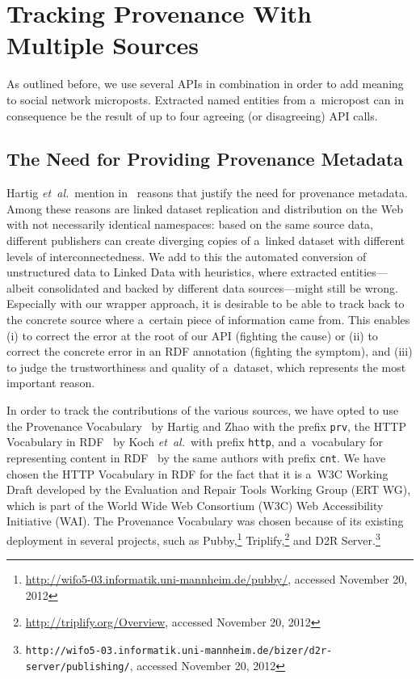 \section{Tracking Provenance With Multiple Sources}                    \label{sec:tracking}

As outlined before, we use several APIs in combination
in order to add meaning to social network microposts.
Extracted named entities from a~micropost can in consequence
be the result of up to four agreeing (or disagreeing) API calls.

\subsection{The Need for Providing Provenance Metadata}

Hartig \emph{et~al.}\ mention in~\cite{hartig2010provenance}
reasons that justify the need for provenance metadata.
Among these reasons are linked dataset replication and distribution
on the Web with not necessarily identical namespaces:
based on the same source data, different publishers can
create diverging copies of a~linked dataset
with different levels of interconnectedness.
We add to this the automated conversion of unstructured data
to Linked Data with heuristics,
where extracted entities---albeit consolidated
and backed by different data sources---might still be wrong.
Especially with our wrapper approach,
it is desirable to be able to track back to the concrete source
where a~certain piece of information came from.
This enables
(i) to correct the error at the root of our API
(fighting the cause) or
(ii) to correct the concrete error in an RDF annotation
(fighting the symptom), and
(iii) to judge the trustworthiness and quality of a~dataset,
which represents the most important reason.

In order to track the contributions of the various sources,
we have opted to use the Provenance
Vocabulary~\cite{hartig2012provenance}
by Hartig and Zhao with the prefix \texttt{prv},
the HTTP Vocabulary in RDF~\cite{koch2011http}
by Koch \emph{et~al.}\ with prefix \texttt{http},
and a~vocabulary for representing content in
RDF~\cite{koch2011content}
by the same authors with prefix \texttt{cnt}.
We have chosen the HTTP Vocabulary in RDF for the fact that
it is a~W3C Working Draft developed by the
Evaluation and Repair Tools Working Group (ERT WG),
which is part of the World Wide Web Consortium (W3C)
Web Accessibility Initiative (WAI).
The Provenance Vocabulary was chosen because of its existing
deployment in several projects, such as
Pubby,\footnote{\url{http://wifo5-03.informatik.uni-mannheim.de/pubby/},
accessed November 20, 2012}
Triplify,\footnote{\url{http://triplify.org/Overview},
accessed November 20, 2012}
and D2R
Server.\footnote{\texttt{http://wifo5-03.informatik.uni-mannheim.de/bizer/d2r-server/publishing/},
accessed November 20, 2012}

